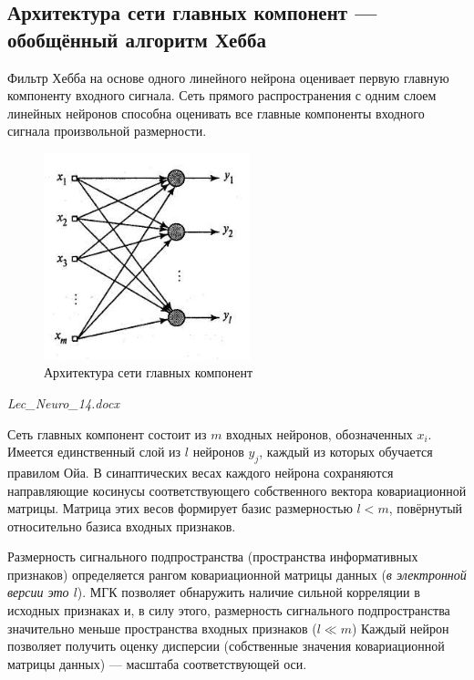 \documentclass{article}
\numberwithin{equation}{subsection}
\begin{document}
\subsection{Архитектура сети главных компонент --- обобщённый алгоритм Хебба}

Фильтр Хебба на основе одного линейного нейрона оценивает первую главную компоненту 
входного сигнала. Сеть прямого распространения с одним слоем линейных нейронов 
способна оценивать все главные компоненты входного сигнала произвольной размерности.

\begin{figure}[htbp]
    \centering
    \includegraphics[height=6cm]{lec_neuro_14_8_6.png}
    \caption{Архитектура сети главных компонент}
    \label{lec_neuro_8_6}
\end{figure}

\begin{myquote}
    \textit{Lec\_Neuro\_14.docx}
\end{myquote}

Сеть главных компонент состоит из $m$ входных нейронов, обозначенных $x_i$.
Имеется единственный слой из $l$ нейронов $y_j$, каждый из которых обучается правилом Ойа. 
В синаптических весах каждого нейрона сохраняются направляющие косинусы соответствующего 
собственного вектора ковариационной матрицы. Матрица этих весов формирует базис размерностью $l<m$, 
повёрнутый относительно базиса входных признаков.

Размерность сигнального подпространства (пространства информативных признаков) определяется 
рангом ковариационной матрицы данных (\textit{в электронной версии это $l$}). МГК позволяет 
обнаружить наличие сильной корреляции в исходных признаках и, в силу этого, размерность
сигнального подпространства значительно меньше пространства входных признаков ($l \ll m$)
Каждый нейрон позволяет получить оценку дисперсии (собственные значения ковариационной 
матрицы данных) --- масштаба соответствующей оси.
\end{document}
